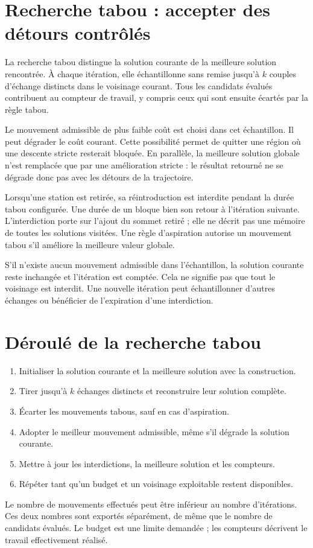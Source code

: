 \section{Recherche tabou : accepter des détours contrôlés}
La recherche tabou distingue la solution courante de la meilleure solution
rencontrée. À chaque itération, elle échantillonne sans remise jusqu'à $k$
couples d'échange distincts dans le voisinage courant. Tous les candidats
évalués contribuent au compteur de travail, y compris ceux qui sont ensuite
écartés par la règle tabou.

Le mouvement admissible de plus faible coût est choisi dans cet échantillon.
Il peut dégrader le coût courant. Cette possibilité permet de quitter une
région où une descente stricte resterait bloquée. En parallèle, la meilleure
solution globale n'est remplacée que par une amélioration stricte : le résultat
retourné ne se dégrade donc pas avec les détours de la trajectoire.

Lorsqu'une station est retirée, sa réintroduction est interdite pendant la
durée tabou configurée. Une durée de un bloque bien son retour à l'itération
suivante. L'interdiction porte sur l'ajout du sommet retiré ; elle ne décrit pas
une mémoire de toutes les solutions visitées. Une règle d'aspiration autorise
un mouvement tabou s'il améliore la meilleure valeur globale.

S'il n'existe aucun mouvement admissible dans l'échantillon, la solution
courante reste inchangée et l'itération est comptée. Cela ne signifie pas que
tout le voisinage est interdit. Une nouvelle itération peut échantillonner
d'autres échanges ou bénéficier de l'expiration d'une interdiction.

\section{Déroulé de la recherche tabou}
\begin{enumerate}
\setlength{\itemsep}{1pt}\setlength{\parskip}{0pt}\setlength{\parsep}{0pt}
\item Initialiser la solution courante et la meilleure solution avec la construction.
\item Tirer jusqu'à $k$ échanges distincts et reconstruire leur solution complète.
\item Écarter les mouvements tabous, sauf en cas d'aspiration.
\item Adopter le meilleur mouvement admissible, même s'il dégrade la solution courante.
\item Mettre à jour les interdictions, la meilleure solution et les compteurs.
\item Répéter tant qu'un budget et un voisinage exploitable restent disponibles.
\end{enumerate}
Le nombre de mouvements effectués peut être inférieur au nombre d'itérations.
Ces deux nombres sont exportés séparément, de même que le nombre de candidats
évalués. Le budget est une limite demandée ; les compteurs décrivent le travail
effectivement réalisé.

